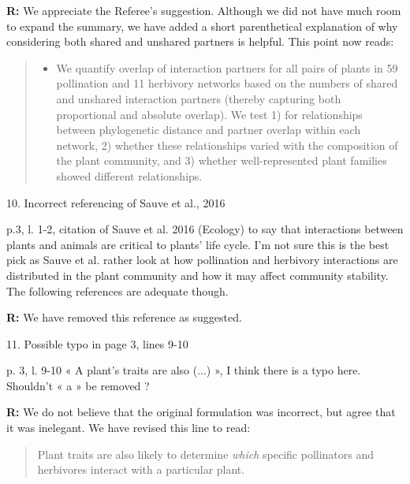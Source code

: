 \documentclass[12pt]{letter}
\newenvironment{refquote}{\bigskip \begin{it}}{\end{it}\smallskip}
\begin{document}
		\textbf{R:} We appreciate the Referee's suggestion. Although we did not have much room to expand the summary, we have added a short parenthetical explanation of why considering both shared and unshared partners is helpful. This point now reads:


		\begin{quotation}

			\begin{itemize}
			\item We quantify overlap of interaction partners for all pairs of plants in 59 pollination and 11 herbivory networks based on the numbers of shared and unshared interaction partners (thereby capturing both proportional and absolute overlap). We test 1) for relationships between phylogenetic distance and partner overlap within each network, 2) whether these relationships varied with the composition of the plant community, and 3) whether well-represented plant families showed different relationships. 
		\end{itemize}

		\end{quotation}


	10. Incorrect referencing of Sauve et al., 2016

		\begin{refquote}
			p.3, l. 1-2, citation of Sauve et al. 2016 (Ecology) to say that interactions between plants and animals are critical to plants’ life cycle. I’m not sure this is the best pick as Sauve et al. rather look at how pollination and herbivory interactions are distributed in the plant community and how it may affect community stability. The following references are adequate though.
		\end{refquote}


		\textbf{R:} We have removed this reference as suggested.


	11. Possible typo in page 3, lines 9-10

		\begin{refquote}
			p. 3, l. 9-10 « A plant’s traits are also (...) », I think there is a typo here. Shouldn’t « a » be removed ?
		\end{refquote}


		\textbf{R:} We do not believe that the original formulation was incorrect, but agree that it was inelegant. We have revised this line to read:


		\begin{quotation}
			Plant traits are also likely to determine \emph{which} specific pollinators 
			  and herbivores interact with a particular plant.
	  	\end{quotation}
\end{document}
